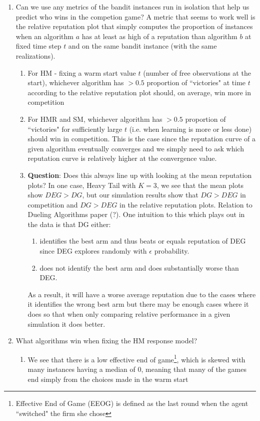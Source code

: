\documentclass[11pt,letterpaper]{article}
\begin{document}
\begin{enumerate}
\item Can we use any metrics of the bandit instances run in isolation that help us predict who wins in the competion game? A metric that seems to work well is the relative reputation plot that simply computes the proportion of instances when an algorithm $a$ has at least as high of a reputation than algorithm $b$ at fixed time step $t$ and on the same bandit instance (with the same realizations).
\begin{enumerate}
\item For HM - fixing a warm start value $t$ (number of free observations at the start), whichever algorithm has $>0.5$ proportion of ``victories" at time $t$ according to the relative reputation plot should, on average, win more in competition
\item For HMR and SM, whichever algorithm has $>0.5$ proportion of ``victories" for sufficiently large $t$ (i.e. when learning is more or less done) should win in competition. This is the case since the reputation curve of a given algorithm eventually converges and we simply need to ask which reputation curve is relatively higher at the convergence value.
\item \textbf{Question}: Does this always line up with looking at the mean reputation plots? In one case, Heavy Tail with $K = 3$, we see that the mean plots show $DEG > DG$, but our simulation results show that $DG > DEG$ in competition and $DG > DEG$ in the relative reputation plots. Relation to Dueling Algorithms paper (?). One intuition to this which plays out in the data is that DG either:
\begin{enumerate}
\item identifies the best arm and thus beats or equals reputation of DEG since DEG explores randomly with $\epsilon$ probability.
\item does not identify the best arm and does substantially worse than DEG.
\end{enumerate}
As a result, it will have a worse average reputation due to the cases where it identifies the wrong best arm but there may be enough cases where it does so that when only comparing relative performance in a given simulation it does better.
\end{enumerate}
\item What algorithms win when fixing the HM response model?
\begin{enumerate}
\item We see that there is a low effective end of game\footnote{Effective End of Game (EEOG) is defined as the last round when the agent ``switched" the firm she chose}, which is skewed with many instances having a median of 0, meaning that many of the games end simply from the choices made in the warm start

\end{enumerate}
\end{enumerate}
\end{document}
